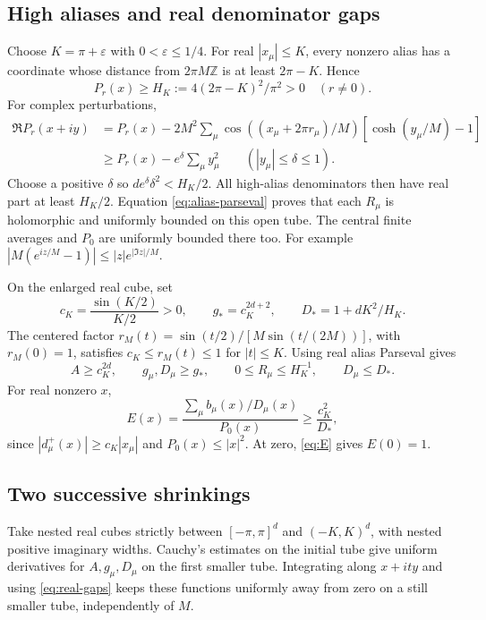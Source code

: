 \documentclass[11pt]{article}
\theoremstyle{remark}
\begin{document}
\subsection{High aliases and real denominator gaps}

Choose $K=\pi+\varepsilon$ with $0<\varepsilon\le1/4$.
For real $|x_\mu|\le K$, every nonzero alias has a coordinate whose
distance from $2\pi M\mathbb Z$ is at least $2\pi-K$. Hence
\[
 P_r(x)\ge H_K:=4(2\pi-K)^2/\pi^2>0\quad(r\ne0).
\]
For complex perturbations,
\begin{align*}
 \Re P_r(x+iy)
 &=P_r(x)-2M^2\sum_\mu\cos((x_\mu+2\pi r_\mu)/M)
                                  [\cosh(y_\mu/M)-1]\\
 &\ge P_r(x)-e^{\delta}\sum_\mu y_\mu^2
 \qquad(|y_\mu|\le\delta\le1).
\end{align*}
Choose a positive $\delta$ so $de^\delta\delta^2<H_K/2$.
All high-alias denominators then have real part at least $H_K/2$.
Equation \eqref{eq:alias-parseval} proves that each $R_\mu$ is
holomorphic and uniformly bounded on this open tube. The central
finite averages and $P_0$ are uniformly bounded there too. For example
$|M(e^{iz/M}-1)|\le |z|e^{|\Im z|/M}$.

On the enlarged real cube, set
\[
 c_K=\frac{\sin(K/2)}{K/2}>0,\qquad
 g_*=c_K^{2d+2},\qquad D_*=1+dK^2/H_K.
\]
The centered factor
$r_M(t)=\sin(t/2)/[M\sin(t/(2M))]$, with $r_M(0)=1$,
satisfies $c_K\le r_M(t)\le1$ for $|t|\le K$.
Using real alias Parseval gives
\begin{equation}\label{eq:real-gaps}
 A\ge c_K^{2d},\qquad
 g_\mu,D_\mu\ge g_*,\qquad
 0\le R_\mu\le H_K^{-1},\qquad D_\mu\le D_*.
\end{equation}
For real nonzero $x$,
\[
 E(x)=\frac{\sum_\mu b_\mu(x)/D_\mu(x)}{P_0(x)}
      \ge\frac{c_K^2}{D_*},
\]
since $|d_\mu^+(x)|\ge c_K|x_\mu|$ and $P_0(x)\le|x|^2$.
At zero, \eqref{eq:E} gives $E(0)=1$.

\subsection{Two successive shrinkings}

Take nested real cubes strictly between $[-\pi,\pi]^d$ and
$(-K,K)^d$, with nested positive imaginary widths. Cauchy's estimates
on the initial tube give uniform derivatives for $A,g_\mu,D_\mu$
on the first smaller tube. Integrating along $x+ity$ and using
\eqref{eq:real-gaps} keeps these functions uniformly away from zero
on a still smaller tube, independently of $M$.
\end{document}
